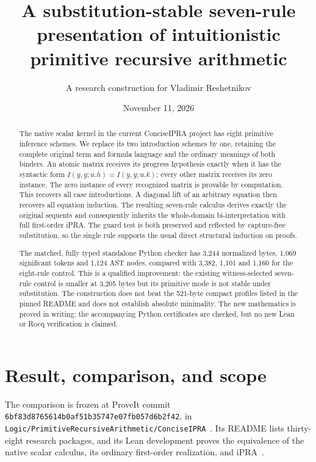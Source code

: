 \documentclass[11pt]{article}
\title{A substitution-stable seven-rule\texorpdfstring{\\}{ }presentation of intuitionistic\texorpdfstring{\\}{ }primitive recursive arithmetic}
\author{A research construction for Vladimir Reshetnikov}
\date{November 11, 2026}
\theoremstyle{definition}
\theoremstyle{remark}
\begin{document}
\maketitle
\begin{abstract}
The native scalar kernel in the current ConciseIPRA project has eight
primitive inference schemes. We replace its two introduction schemes by
one, retaining the complete original term and formula language and the
ordinary meanings of both binders. An atomic matrix receives its
progress hypothesis exactly when it has the syntactic form
\(I(y,y;u.h)=I(y,y;u.k)\); every other matrix receives its zero
instance. The zero instance of every recognized matrix is provable by
computation. This recovers all case introductions. A diagonal lift of an
arbitrary equation then recovers all equation induction. The resulting
seven-rule calculus derives exactly the original sequents and consequently
inherits the whole-domain bi-interpretation with full first-order iPRA.
The guard test is both preserved and reflected by capture-free substitution,
so the single rule supports the usual direct structural induction on proofs.

The matched, fully typed standalone Python checker has 3,244 normalized
bytes, 1,069 significant tokens and 1,124 AST nodes, compared with
3,382, 1,101 and 1,160 for the eight-rule control. This is a qualified
improvement: the existing witness-selected seven-rule control is smaller
at 3,205 bytes but its primitive mode is not stable under substitution.
The construction does not beat the 521-byte compact profiles listed in the pinned README
and does not establish absolute minimality. The new mathematics is proved
in writing; the accompanying Python certificates are checked, but no new
Lean or Rocq verification is claimed.
\end{abstract}
\tableofcontents
\newpage

\section{Result, comparison, and scope}
\label{sec:result-scope}

The comparison is frozen at ProveIt commit
\texttt{6bf83d8765614b0af51b35747e07fb057d6b2f42}, in
\texttt{Logic/PrimitiveRecursiveArithmetic/ConciseIPRA}~\cite{repo}.
Its README lists thirty-eight research packages, and its Lean development
proves the equivalence of the native scalar calculus, its ordinary
first-order realization, and iPRA~\cite{native,bridge}.
\end{document}
